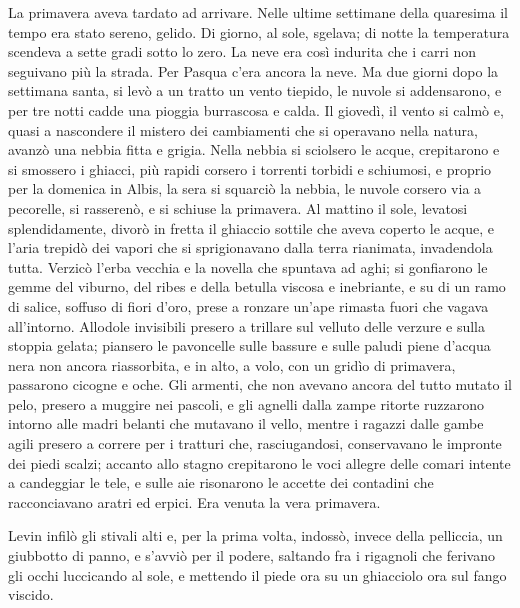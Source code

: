 La primavera aveva tardato ad arrivare. Nelle ultime settimane della quaresima il tempo era stato sereno, gelido. Di giorno, al sole, sgelava; di notte la temperatura scendeva a sette gradi sotto lo zero. La neve era così indurita che i carri non seguivano più la strada. Per Pasqua c'era ancora la neve. Ma due giorni dopo la settimana santa, si levò a un tratto un vento tiepido, le nuvole si addensarono, e per tre notti cadde una pioggia burrascosa e calda. Il giovedì, il vento si calmò e, quasi a nascondere il mistero dei cambiamenti che si operavano nella natura, avanzò una nebbia fitta e grigia. Nella nebbia si sciolsero le acque, crepitarono e si smossero i ghiacci, più rapidi corsero i torrenti torbidi e schiumosi, e proprio per la domenica in Albis, la sera si squarciò la nebbia, le nuvole corsero via a pecorelle, si rasserenò, e si schiuse la primavera. Al mattino il sole, levatosi splendidamente, divorò in fretta il ghiaccio sottile che aveva coperto le acque, e l'aria trepidò dei vapori che si sprigionavano dalla terra rianimata, invadendola tutta. Verzicò l'erba vecchia e la novella che spuntava ad aghi; si gonfiarono le gemme del viburno, del ribes e della betulla viscosa e inebriante, e su di un ramo di salice, soffuso di fiori d'oro, prese a ronzare un'ape rimasta fuori che vagava all'intorno. Allodole invisibili presero a trillare sul velluto delle verzure e sulla stoppia gelata; piansero le pavoncelle sulle bassure e sulle paludi piene d'acqua nera non ancora riassorbita, e in alto, a volo, con un gridìo di primavera, passarono cicogne e oche. Gli armenti, che non avevano ancora del tutto mutato il pelo, presero a muggire nei pascoli, e gli agnelli dalla zampe ritorte ruzzarono intorno alle madri belanti che mutavano il vello, mentre i ragazzi dalle gambe agili presero a correre per i tratturi che, rasciugandosi, conservavano le impronte dei piedi scalzi; accanto allo stagno crepitarono le voci allegre delle comari intente a candeggiar le tele, e sulle aie risonarono le accette dei contadini che racconciavano aratri ed erpici. Era venuta la vera primavera. 

\label{xiii-1} 

Levin infilò gli stivali alti e, per la prima volta, indossò, invece della pelliccia, un giubbotto di panno, e s'avviò per il podere, saltando fra i rigagnoli che ferivano gli occhi luccicando al sole, e mettendo il piede ora su un ghiacciolo ora sul fango viscido. 

